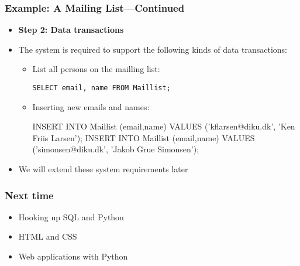 \documentclass[dvipsnames]{beamer}
\begin{document}
\begin{frame}[fragile=singleslide]
\frametitle{Example: A Mailing List---Continued} 

\begin{itemize}
\item \textbf{Step 2: Data transactions}


\item The system is required to support the following kinds of data
  transactions:
  \begin{itemize}
  \item List all persons on the mailling list:
    \begin{small}
\begin{verbatim}
SELECT email, name FROM Maillist;
\end{verbatim}
    \end{small}
  \item Inserting new emails and names:
    \begin{small}
\begin{semiverbatim}
INSERT INTO Maillist (email,name) VALUES
  ('kflarsen@diku.dk', 'Ken Friis Larsen');
INSERT INTO Maillist (email,name) VALUES
  ('simonsen@diku.dk', 'Jakob Grue Simonsen');
\end{semiverbatim}
    \end{small}
  \end{itemize}
\item We will extend these system requirements later
\end{itemize}
\end{frame}



\begin{frame}
\frametitle{Next time}

\begin{itemize}
\item Hooking up SQL and Python
\item HTML and CSS
\item Web applications with Python
\end{itemize}

\end{frame}
\end{document}
